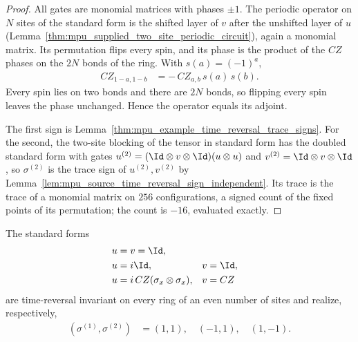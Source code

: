 \begin{proof}\leanok
    All gates are monomial matrices with phases $\pm1$. The periodic operator
    on $N$ sites of the standard form is the shifted layer of $v$ after the
    unshifted layer of $u$
    (Lemma~\ref{thm:mpu_supplied_two_site_periodic_circuit}), again a
    monomial matrix. Its permutation flips every spin, and its phase is the
    product of the $CZ$ phases on the $2N$ bonds of the ring. With
    $s(a)=(-1)^a$,
    \begin{align}
        CZ_{1-a,1-b} & =-\,CZ_{a,b}\,s(a)\,s(b).
    \end{align}
    Every spin lies on two bonds and there are $2N$ bonds, so flipping every
    spin leaves the phase unchanged. Hence the operator equals its adjoint.

    The first sign is Lemma~\ref{thm:mpu_example_time_reversal_trace_signs}.
    For the second, the two-site blocking of the tensor in standard form has
    the doubled standard form with gates
    $u^{(2)}=(\Id\otimes v\otimes\Id)(u\otimes u)$ and
    $v^{(2)}=\Id\otimes v\otimes\Id$, so $\sigma^{(2)}$ is the trace sign of
    $u^{(2)},v^{(2)}$ by
    Lemma~\ref{lem:mpu_source_time_reversal_sign_independent}. Its trace is
    the trace of a monomial matrix on $256$ configurations, a signed count of
    the fixed points of its permutation; the count is $-16$, evaluated
    exactly.
\end{proof}

\begin{lemma}
    \label{ex:dagger-all-but-czx}
    \leanok
    The standard forms
    \begin{align}
        u & =v=\Id,                                      \\
        u & =i\Id,                           & v & =\Id, \\
        u & =i\,CZ(\sigma_x\otimes\sigma_x), & v & =CZ
    \end{align}
    are time-reversal invariant on every ring of an even number of sites and
    realize, respectively,
    \begin{align}
        (\sigma^{(1)},\sigma^{(2)})
         & =(1,1),\quad(-1,1),\quad(1,-1).
    \end{align}
\end{lemma}

